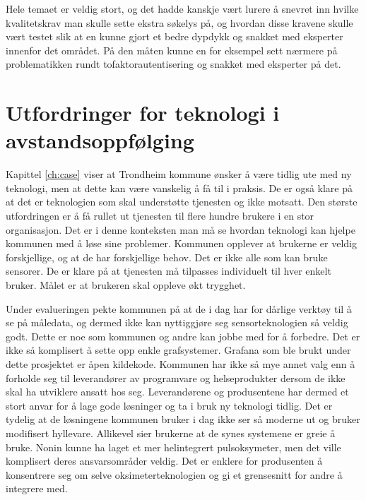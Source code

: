 Hele temaet er veldig stort, og det hadde kanskje vært
lurere å snevret inn hvilke kvalitetskrav man skulle sette ekstra søkelys på, og hvordan disse kravene
skulle vært testet slik at en kunne gjort et bedre dypdykk
og snakket med eksperter innenfor det området. På den måten kunne en for eksempel sett nærmere på problematikken rundt
tofaktorautentisering og snakket med eksperter på det.

\iffalse
\section{Utfordringer for teknologi i avstandsoppfølging}
Kapittel \ref{ch:case} viser at Trondheim kommune ønsker å være tidlig ute med ny teknologi, men at dette kan være vanskelig å
få til i praksis. De er også klare på at det er teknologien som skal understøtte tjenesten og ikke motsatt. Den største
utfordringen er å få rullet ut tjenesten til flere hundre brukere i en stor organisasjon. Det er i denne konteksten
man må se hvordan teknologi kan hjelpe kommunen med å løse sine problemer. Kommunen opplever at brukerne er veldig forskjellige, og
at de har forskjellige behov. Det er ikke alle som kan bruke sensorer. De er klare på at tjenesten må tilpasses individuelt til hver
enkelt bruker. Målet er at brukeren skal oppleve økt trygghet.

Under evalueringen pekte kommunen på at de i dag har for dårlige verktøy
til å se på måledata, og dermed ikke kan nyttiggjøre seg sensorteknologien så veldig godt. Dette er noe som kommunen og andre kan jobbe med
for å forbedre. Det er ikke så komplisert å sette opp enkle grafsystemer. Grafana som ble brukt under dette prosjektet er åpen kildekode.
Kommunen har ikke så mye annet valg enn å forholde seg til leverandører av programvare og helseprodukter dersom de
ikke skal ha utviklere ansatt hos seg. Leverandørene og produsentene
har dermed et stort anvar for å lage gode løsninger og ta i bruk ny teknologi tidlig. Det er tydelig at de løsningene kommunen bruker i dag
ikke ser så moderne ut og bruker modifisert hyllevare. Allikevel sier brukerne at de synes systemene er greie å bruke. Nonin kunne ha laget
et mer helintegrert pulsoksymeter, men det ville komplisert deres ansvarsområder veldig. Det er enklere for produsenten å konsentrere seg om
selve oksimeterteknologien og gi et grensesnitt for andre å integrere med.

